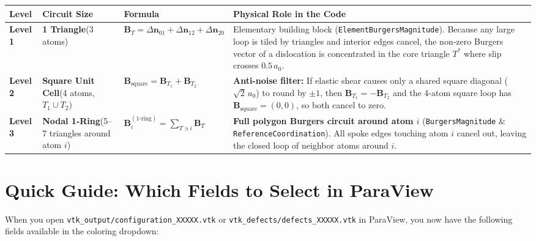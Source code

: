\documentclass[11pt,a4paper]{article}
\newcommand{\code}[1]{\texttt{#1}}
\begin{document}
\begin{table}[htbp]
  \centering
  \small
  \renewcommand{\arraystretch}{1.25}
  \begin{tabular}{@{}p{1.6cm}p{2.9cm}p{3.8cm}p{6.5cm}@{}}
    \toprule
    \textbf{Level} & \textbf{Circuit Size} & \textbf{Formula} & \textbf{Physical Role in the Code} \\
    \midrule
    \textbf{Level 1} & \textbf{1 Triangle}\newline (3 atoms) & $\bm{B}_T = \Delta\bm{n}_{01} + \Delta\bm{n}_{12} + \Delta\bm{n}_{20}$ & Elementary building block (\code{ElementBurgersMagnitude}). Because any large loop is tiled by triangles and interior edges cancel, the non-zero Burgers vector of a dislocation is concentrated in the core triangle $T^*$ where slip crosses $0.5\,a_0$. \\
    \textbf{Level 2} & \textbf{Square Unit Cell}\newline (4 atoms, $T_1 \cup T_2$) & $\bm{B}_{\mathrm{square}} = \bm{B}_{T_1} + \bm{B}_{T_2}$ & \textbf{Anti-noise filter:} If elastic shear causes only a shared square diagonal ($\sqrt{2}\,a_0$) to round by $\pm 1$, then $\bm{B}_{T_1} = -\bm{B}_{T_2}$ and the 4-atom square loop has $\bm{B}_{\mathrm{square}} = (0,0)$, so both cancel to zero. \\
    \textbf{Level 3} & \textbf{Nodal 1-Ring}\newline (5--7 triangles around atom $i$) & $\bm{B}_i^{(1\text{-ring})} = \sum_{T \ni i} \bm{B}_T$ & \textbf{Full polygon Burgers circuit around atom $i$} (\code{BurgersMagnitude} \& \code{ReferenceCoordination}). All spoke edges touching atom $i$ cancel out, leaving the closed loop of neighbor atoms around $i$. \\
    \bottomrule
  \end{tabular}
\end{table}

\section{Quick Guide: Which Fields to Select in ParaView}

When you open \code{vtk\_output/configuration\_XXXXX.vtk} or \code{vtk\_defects/defects\_XXXXX.vtk}
in ParaView, you now have the following fields available in the coloring dropdown:
\end{document}
